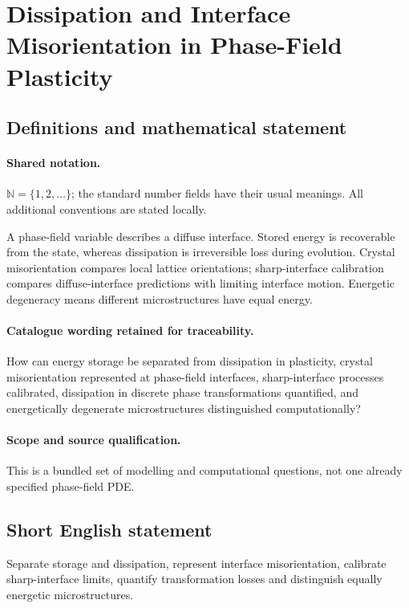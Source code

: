 \documentclass[11pt]{article}
\begin{document}
\section{Dissipation and Interface Misorientation in Phase-Field Plasticity}\label{statement}

\subsection{Definitions and mathematical statement}

\paragraph{Shared notation.}$\mathbb N=\{1,2,\ldots\}$; the standard number fields have their usual meanings. All additional conventions are stated locally.


A phase-field variable describes a diffuse interface. Stored energy is recoverable from the state, whereas dissipation is irreversible loss during evolution. Crystal misorientation compares local lattice orientations; sharp-interface calibration compares diffuse-interface predictions with limiting interface motion. Energetic degeneracy means different microstructures have equal energy.

\paragraph{Catalogue wording retained for traceability.}
How can energy storage be separated from dissipation in plasticity, crystal misorientation represented at phase-field interfaces, sharp-interface processes calibrated, dissipation in discrete phase transformations quantified, and energetically degenerate microstructures distinguished computationally?

\paragraph{Scope and source qualification.}This is a bundled set of modelling and computational questions, not one already specified phase-field PDE.
\subsection{Short English statement}
Separate storage and dissipation, represent interface misorientation, calibrate sharp-interface limits, quantify transformation losses and distinguish equally energetic microstructures.
\end{document}
